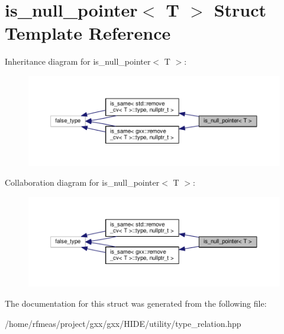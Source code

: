 \hypertarget{structis__null__pointer}{}\section{is\+\_\+null\+\_\+pointer$<$ T $>$ Struct Template Reference}
\label{structis__null__pointer}


Inheritance diagram for is\+\_\+null\+\_\+pointer$<$ T $>$\+:
\nopagebreak
\begin{figure}[H]
\begin{center}
\leavevmode
\includegraphics[width=350pt]{structis__null__pointer__inherit__graph}
\end{center}
\end{figure}


Collaboration diagram for is\+\_\+null\+\_\+pointer$<$ T $>$\+:
\nopagebreak
\begin{figure}[H]
\begin{center}
\leavevmode
\includegraphics[width=350pt]{structis__null__pointer__coll__graph}
\end{center}
\end{figure}


The documentation for this struct was generated from the following file\+:\begin{DoxyCompactItemize}
\item 
/home/rfmeas/project/gxx/gxx/\+H\+I\+D\+E/utility/type\+\_\+relation.\+hpp\end{DoxyCompactItemize}
